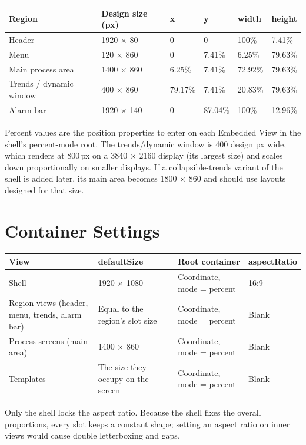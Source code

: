 \begin{center}
\begin{tabular}{@{}P{3.93cm}P{2.72cm}P{1.96cm}P{1.96cm}P{2.72cm}P{2.37cm}@{}}
\toprule
{}\textbf{Region} & \textbf{Design size (px)} & \textbf{x} & \textbf{y} & \textbf{width} & \textbf{height} \\
\midrule
Header & 1920 $\times$ 80 & 0 & 0 & 100\% & 7.41\% \\
Menu & 120 $\times$ 860 & 0 & 7.41\% & 6.25\% & 79.63\% \\
Main process area & 1400 $\times$ 860 & 6.25\% & 7.41\% & 72.92\% & 79.63\% \\
Trends / dynamic window & 400 $\times$ 860 & 79.17\% & 7.41\% & 20.83\% & 79.63\% \\
Alarm bar & 1920 $\times$ 140 & 0 & 87.04\% & 100\% & 12.96\% \\
\bottomrule
\end{tabular}
\end{center}
Percent values are the position properties to enter on each Embedded View in the shell's percent-mode root. The trends/dynamic window is 400 design px wide, which renders at 800\,px on a 3840 $\times$ 2160 display (its largest size) and scales down proportionally on smaller displays. If a collapsible-trends variant of the shell is added later, its main area becomes 1800 $\times$ 860 and should use layouts designed for that size.

\section{Container Settings}
\begin{center}
\begin{tabular}{@{}P{4.98cm}P{4.16cm}P{4.77cm}P{2.60cm}@{}}
\toprule
{}\textbf{View} & \textbf{defaultSize} & \textbf{Root container} & \textbf{aspectRatio} \\
\midrule
Shell & 1920 $\times$ 1080 & Coordinate, mode = percent & 16:9 \\
Region views (header, menu, trends, alarm bar) & Equal to the region's slot size & Coordinate, mode = percent & Blank \\
Process screens (main area) & 1400 $\times$ 860 & Coordinate, mode = percent & Blank \\
Templates & The size they occupy on the screen & Coordinate, mode = percent & Blank \\
\bottomrule
\end{tabular}
\end{center}
Only the shell locks the aspect ratio. Because the shell fixes the overall proportions, every slot keeps a constant shape; setting an aspect ratio on inner views would cause double letterboxing and gaps.

